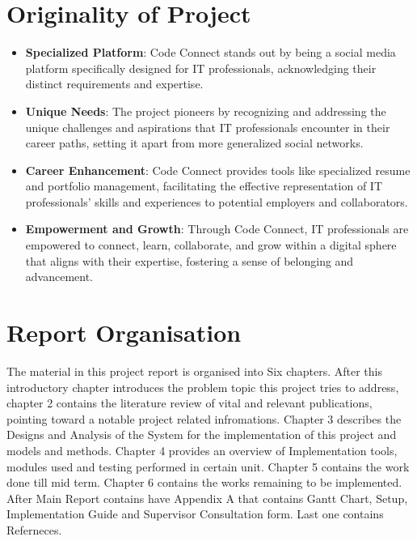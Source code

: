 \section{Originality of Project}

\begin{itemize}
    \item \textbf{Specialized Platform}: Code Connect stands out by being a social media platform specifically designed for IT professionals, acknowledging their distinct requirements and expertise.
    \item \textbf{Unique Needs}: The project pioneers by recognizing and addressing the unique challenges and aspirations that IT professionals encounter in their career paths, setting it apart from more generalized social networks.
    \item \textbf{Career Enhancement}: Code Connect provides tools like specialized resume and portfolio management, facilitating the effective representation of IT professionals' skills and experiences to potential employers and collaborators.
    \item \textbf{Empowerment and Growth}: Through Code Connect, IT professionals are empowered to connect, learn, collaborate, and grow within a digital sphere that aligns with their expertise, fostering a sense of belonging and advancement.
    
  \end{itemize}

\section{Report Organisation}
The material in this project report is organised into Six chapters. After this introductory chapter introduces the problem topic this project tries to address, chapter 2 contains the literature review of vital and relevant publications, pointing toward a notable project related infromations. Chapter 3 describes the Designs and Analysis of the System for the implementation of this project and models and methods. Chapter 4 provides an overview of Implementation tools, modules used and testing performed in certain unit. Chapter 5 contains the work done till mid term. Chapter 6 contains the works remaining to be implemented. After Main Report contains have Appendix A that contains Gantt Chart, Setup, Implementation Guide and Supervisor Consultation form. Last one contains Referneces.